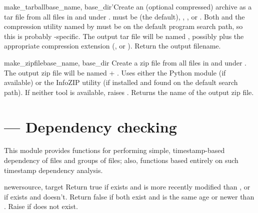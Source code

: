 \documentclass{manual}
\begin{document}
\begin{funcdesc}{make_tarball}{base_name, base_dir}'Create an (optional compressed) archive as a tar file from all files in and under .  must be  (the default), 
, , or .  Both 
and the compression utility named by  must be on the 
default program search path, so this is probably \UNIX-specific.  The 
output tar file will be named , possibly plus
the appropriate compression extension (,  or
).  Return the output filename.

\end{funcdesc}

\begin{funcdesc}{make_zipfile}{base_name, base_dir}
Create a zip file from all files in and under .  The output
zip file will be named  + .  Uses either the 
 Python module (if available) or the InfoZIP  
utility (if installed and found on the default search path).  If neither 
tool is available, raises .  
Returns the name of the output zip file.
\end{funcdesc}

\section{ --- Dependency checking}

This module provides functions for performing simple, timestamp-based 
dependency of files and groups of files; also, functions based entirely 
on such timestamp dependency analysis.

\begin{funcdesc}{newer}{source, target}
Return true if  exists and is more recently modified than
, or if  exists and  doesn't.
Return false if both exist and  is the same age or newer 
than .
Raise  if  does not exist.
\end{funcdesc}
\end{document}
